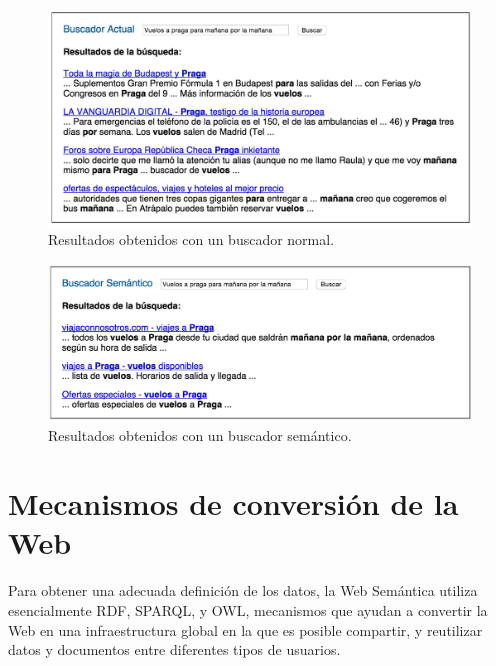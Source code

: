 \documentclass[10pt,a4paper]{article}
\begin{document}
\begin{figure}[H] %
\begin{center}
\includegraphics[width=400pt]{imgs/resultadoNormal}
\caption{Resultados obtenidos con un buscador normal.}
\end{center}
\end{figure}
\begin{figure}[H] %
\begin{center}
\includegraphics[width=400pt]{imgs/resultadoSemantico}
\caption{Resultados obtenidos con un buscador semántico.}
\end{center}
\end{figure}

\newpage
\section{Mecanismos de conversión de la Web}
Para obtener una adecuada definición de los datos, la Web Semántica utiliza esencialmente RDF, SPARQL, y OWL, mecanismos que ayudan a convertir la Web en una infraestructura global en la que es posible compartir, y reutilizar datos y documentos entre diferentes tipos de usuarios.
\end{document}
